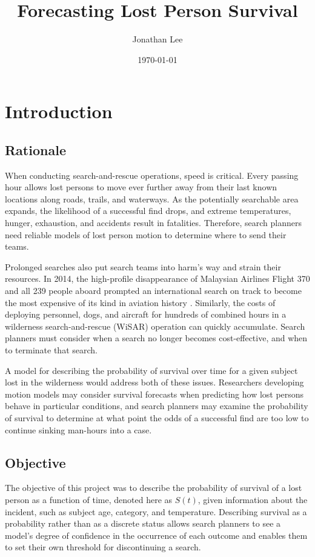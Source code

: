 \documentclass[12pt,titlepage]{article}
\begin{document}
  \title{Forecasting Lost Person Survival}
  \author{Jonathan Lee}
  \date{\today}
  \maketitle

  \abstract{
    \ldots
  }

  \section{Introduction}
    \subsection{Rationale}
      When conducting search-and-rescue operations, speed is critical. Every
      passing hour allows lost persons to move ever further away from their
      last known locations along roads, trails, and waterways. As the
      potentially searchable area expands, the likelihood of a successful find
      drops, and extreme temperatures, hunger, exhaustion, and accidents result
      in fatalities. Therefore, search planners need reliable models of lost
      person motion to determine where to send their teams.

      Prolonged searches also put search teams into harm's way and strain their
      resources. In 2014, the high-profile disappearance of Malaysian Airlines
      Flight 370 and all 239 people aboard prompted an international search on
      track to become the most expensive of its kind in aviation history
      \cite{semple}. Similarly, the costs of deploying personnel, dogs, and
      aircraft for hundreds of combined hours in a wilderness search-and-rescue
      (WiSAR) operation can quickly accumulate. Search planners must consider
      when a search no longer becomes cost-effective, and when to terminate
      that search.

      A model for describing the probability of survival over time for a given
      subject lost in the wilderness would address both of these issues.
      Researchers developing motion models may consider survival forecasts when
      predicting how lost persons behave in particular conditions, and search
      planners may examine the probability of survival to determine at what
      point the odds of a successful find are too low to continue sinking
      man-hours into a case.

    \subsection{Objective}
      The objective of this project was to describe the probability of survival
      of a lost person as a function of time, denoted here as $S(t)$, given
      information about the incident, such as subject age, category, and
      temperature. Describing survival as a probability rather than as a
      discrete status allows search planners to see a model's degree of
      confidence in the occurrence of each outcome and enables them to set
      their own threshold for discontinuing a search.
\end{document}
